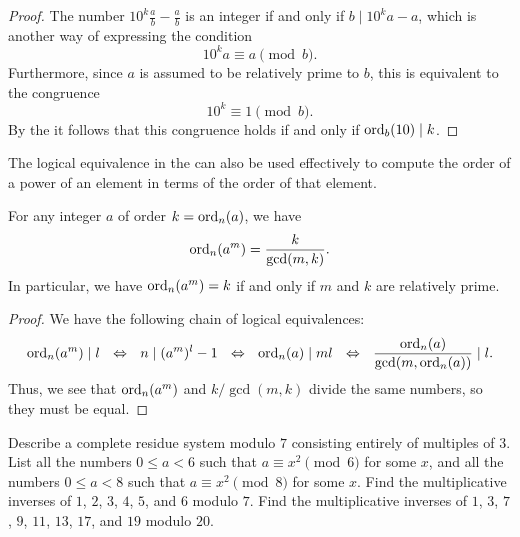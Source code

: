 \begin{proof}
  The number $10^k\frac{a}{b}-\frac{a}{b}$ is an integer if and only if $b\mid 10^ka-a$, which is another way of expressing the condition
  \begin{equation*}
    10^ka \equiv a \pmod{b}.
  \end{equation*}
  Furthermore, since $a$ is assumed to be relatively prime to $b$, this is equivalent to the congruence
  \begin{equation*}
    10^k \equiv 1 \pmod{b}.
  \end{equation*}
  By the  it follows that this congruence holds if and only if $\operatorname{ord}_b(10)\mid k$.
\end{proof}

The logical equivalence in the  can also be used effectively to compute the order of a power of an element in terms of the order of that element.

\begin{theorem}\label{theorem:order-power}
  For any integer $a$ of order $k=\operatorname{ord}_n(a)$, we have
  \begin{equation*}
    \operatorname{ord}_n(a^m)=\frac{k}{\gcd(m,k)}.
  \end{equation*}
  In particular, we have $\operatorname{ord}_n(a^m)=k$ if and only if $m$ and $k$ are relatively prime.
\end{theorem}

\begin{proof}
  We have the following chain of logical equivalences:
  \begin{equation*}
    \operatorname{ord}_n(a^m) \mid l ~~\Leftrightarrow~~ n \mid (a^m)^l-1
    ~~\Leftrightarrow~~ \operatorname{ord}_n(a) \mid ml
    ~~\Leftrightarrow~~ \frac{\operatorname{ord}_n(a)}{\gcd(m,\operatorname{ord}_n(a))} \mid l.
  \end{equation*}
  Thus, we see that $\operatorname{ord}_n(a^m)$ and $k/\gcd(m,k)$ divide the same numbers, so they must be equal.
\end{proof}

\exercises

\begin{starter}
  \exercise Describe a complete residue system modulo $7$ consisting entirely of multiples of $3$.
  \exercise List all the numbers $0\leq a<6$ such that $a\equiv x^2\pmod 6$ for some $x$, and all the numbers $0\leq a<8$ such that $a\equiv x^2\pmod 8$ for some $x$.
  \exercise Find the multiplicative inverses of $1$, $2$, $3$, $4$, $5$, and $6$ modulo $7$.
  \exercise Find the multiplicative inverses of $1$, $3$, $7$, $9$, $11$, $13$, $17$, and $19$ modulo $20$.  
\end{starter}

